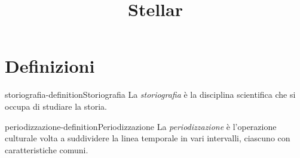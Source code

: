 \documentclass[preview]{standalone}
\begin{document}
\title{Stellar}
\genpage

\section{Definizioni}

\begin{snippetdefinition}{storiografia-definition}{Storiografia}
    La \textit{storiografia} è la disciplina scientifica che si occupa di studiare la storia.
\end{snippetdefinition}

\begin{snippetdefinition}{periodizzazione-definition}{Periodizzazione}
    La \textit{periodizzazione} è l'operazione culturale volta a suddividere la linea temporale in vari intervalli,
    ciascuno con caratteristiche comuni.
\end{snippetdefinition}

\end{document}

